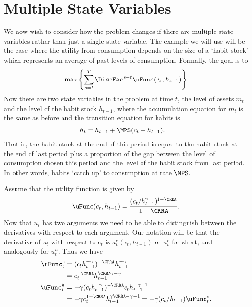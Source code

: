 \documentclass[\econtexRoot/SolvingMicroDSOPs]{subfiles}
\begin{document}
\hypertarget{Multiple-State-Variables}{}
\section{Multiple State Variables}
We now wish to consider how the problem changes if there are multiple
state variables rather than just a single state variable.  The example
we will use will be the case where the utility from consumption
depends on the size of a `habit stock' which represents an average of
past levels of consumption.  Formally, the goal is to
\begin{equation}
  \max \left\{ \sum_{s=t}^{T} \DiscFac^{s-t} \uFunc({c}_{s},h_{s-1}) \right\}
\end{equation}
Now there are two state variables in the problem at time $t$, the
level of assets ${m}_{t}$ and the level of the habit stock $h_{t-1}$,
where the accumulation equation for ${m}_{t}$ is the same as before and
the transition equation for habits is
\begin{equation}\begin{gathered}\begin{aligned}
  h_{t}  & = h_{t-1} + \MPS({c}_{t}-h_{t-1}).
\end{aligned}\end{gathered}\end{equation}
That is, the habit stock at the end of this period is equal to the
habit stock at the end of last period plus a proportion of the gap
between the level of consumption chosen this period and the level of
the habit stock from last period.  In other words, habits `catch up'
to consumption at rate $\MPS$.

Assume that the utility function is given by
\begin{equation}
  \uFunc({c}_{t},h_{t-1}) = \frac{({c}_{t}/h_{t-1}^{\gamma})^{1-\CRRA}}{1-\CRRA}.
\end{equation}
Now that $u_{t}$ has two arguments we need to be able to distinguish
between the derivatives with respect to each argument.  Our notation
will be that the derivative of $u_{t}$ with respect to ${c}_{t}$ is
$u_{t}^{c}({c}_{t},h_{t-1})$ or $u_{t}^{c}$ for short, and analogously
for $u_{t}^{h}$.  Thus we have
\begin{equation}\begin{gathered}\begin{aligned}
  \uFunc^{c}_{t}  & = ({c}_{t} h_{t-1}^{-\gamma})^{-\CRRA}h_{t-1}^{-\gamma}  \\
                  & = {c}_{t}^{-\CRRA}h_{t-1}^{\CRRA\gamma-\gamma}  \\
  \uFunc^{h}_{t}  & = -\gamma ({c}_{t} h_{t-1}^{-\gamma})^{-\CRRA} {c}_{t} h_{t-1}^{-\gamma-1} \\
                  & = -\gamma {c}_{t}^{1-\CRRA}h_{t-1}^{\gamma\CRRA - \gamma -
                    1} = -\gamma ({c}_{t}/h_{t-1}) \uFunc^{c}_{t}.
\end{aligned}\end{gathered}\end{equation}
\end{document}
